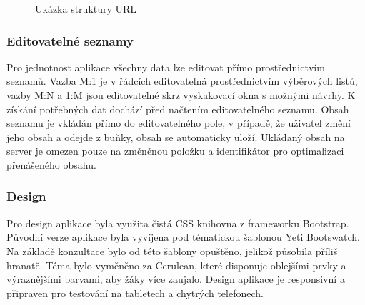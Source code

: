 \documentclass[a4paper,11pt,titlepage,fleqn]{article}
\begin{document}
            \begin{figure}[ht!]
                \caption{Ukázka struktury URL}
                \label{url-model}
            \end{figure}

        \subsubsection{Editovatelné seznamy}
            Pro jednotnost aplikace všechny data lze editovat přímo prostřednictvím seznamů. Vazba M:1 je v řádcích editovatelná prostřednictvím výběrových listů, vazby M:N a 1:M jsou editovatelné skrz vyskakovací okna s možnými návrhy. K získání potřebných dat dochází před načtením editovatelného seznamu. Obsah seznamu je vkládán přímo do editovatelného pole, v případě, že uživatel změní jeho obsah a odejde z buňky, obsah se automaticky uloží. Ukládaný obsah na server je omezen pouze na změněnou položku a identifikátor pro optimalizaci přenášeného obsahu. 

        \subsubsection{Design}
            Pro design aplikace byla využita čistá CSS knihovna z frameworku Bootstrap. Původní verze aplikace byla vyvíjena pod tématickou šablonou Yeti Bootswatch. Na základě konzultace bylo od této šablony opuštěno, jelikož působila příliš hranatě. Téma bylo vyměněno za Cerulean, které disponuje oblejšími prvky a výraznějšími barvami, aby žáky více zaujalo. Design aplikace je responsivní a připraven pro testování na tabletech a chytrých telefonech.
\end{document}

